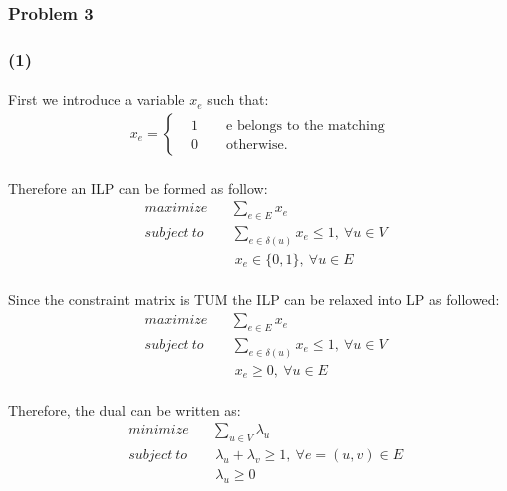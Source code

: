 \subsubsection*{Problem 3}
\subsubsection*{(1)}
\paragraph{}
First we introduce a variable $x_e$ such that:
\begin{align*}
x_e = \begin{cases}
&1 \qquad \text{e belongs to the matching}\\
&0 \qquad \text{otherwise}.
\end{cases}
\end{align*}
\paragraph{}
Therefore an ILP can be formed as follow:
\begin{align*}
& maximize \quad \ \ \ \sum_{e\in E} x_e\\
& subject \ to \qquad \sum_{e\in\delta(u)} x_e \leq 1, \ \forall u \in V\\
&\qquad \qquad \quad \quad  \ \ x_e \in \{0, 1\}, \ \forall u \in E
\end{align*}
\paragraph{}
Since the constraint matrix is TUM the ILP can be relaxed into LP as followed:
\begin{align*}
& maximize \quad \ \ \ \sum_{e\in E} x_e\\
& subject \ to \qquad \sum_{e\in\delta(u)} x_e \leq 1, \ \forall u \in V\\
&\qquad \qquad \quad \quad  \ \ x_e \geq 0, \ \forall u \in E
\end{align*}
\paragraph{}
Therefore, the dual can be written as:
\begin{align*}
& minimize \quad \ \ \ \sum_{u\in V} \lambda_u\\
& subject \ to \qquad \lambda_u + \lambda_v \geq 1, \ \forall e=(u, v) \in E\\
&\qquad \qquad \quad \quad \ \lambda_u \geq 0
\end{align*}

